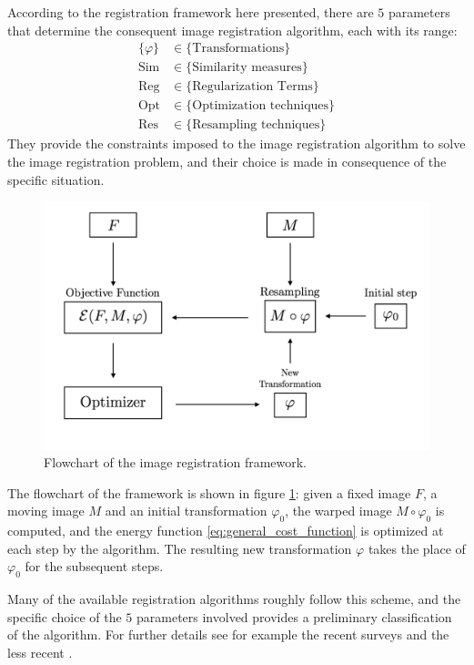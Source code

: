 According to the registration framework here presented, there are  $5$ parameters that determine the consequent image registration algorithm, each with its range:
\begin{align*}
\{  \varphi \} &\in \{ \text{Transformations}\}\\
\text{Sim} &\in \{ \text{Similarity measures}\}\\
\text{Reg} &\in \{ \text{Regularization Terms}\}\\
\text{Opt} &\in \{ \text{Optimization techniques}\}\\
\text{Res} &\in \{ \text{Resampling techniques}\}
\end{align*}
They provide the constraints imposed to the image registration algorithm to solve the image registration problem, and their choice is made in consequence of the specific situation. 
\begin{figure}[!ht]
	\centering
	\includegraphics[scale=0.25]{figures/iterative_algorithm.pdf}
	\caption{Flowchart of the image registration framework.}
	\label{fig:iterative_algorithm_scheme}
\end{figure}
The flowchart of the framework is shown in figure \ref{fig:iterative_algorithm_scheme}: given a fixed image $F$, a moving image $M$ and an initial transformation $\varphi_0$, the warped image $M\circ\varphi_{0}$ is computed, and the 
energy function \ref{eq:general_cost_function} is optimized at each step by the algorithm. The resulting new transformation $\varphi$ takes the place of $\varphi_0$ for the subsequent steps.

Many of the available registration algorithms roughly follow this scheme, and the specific choice of the $5$ parameters involved provides a preliminary classification of the algorithm.
For further details see for example the recent surveys \cite{Sotiras:survey:13} and the less recent \cite{zitova2003image}. 

